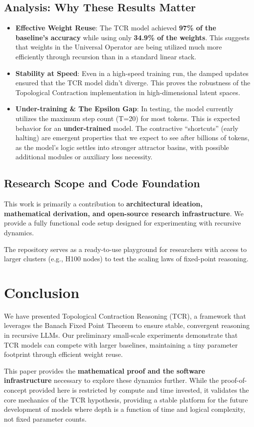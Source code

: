 \documentclass[11pt, a4paper]{article}
\begin{document}
\subsection{Analysis: Why These Results Matter}
\begin{itemize}
    \item \textbf{Effective Weight Reuse}: The TCR model achieved \textbf{97\% of the baseline's accuracy} while using only \textbf{34.9\% of the weights}. This suggests that weights in the Universal Operator are being utilized much more efficiently through recursion than in a standard linear stack.
    \item \textbf{Stability at Speed}: Even in a high-speed training run, the damped updates ensured that the TCR model didn't diverge. This proves the robustness of the Topological Contraction implementation in high-dimensional latent spaces.
    \item \textbf{Under-training \& The Epsilon Gap}: In testing, the model currently utilizes the maximum step count (T=20) for most tokens. This is expected behavior for an \textbf{under-trained} model. The contractive ``shortcuts'' (early halting) are emergent properties that we expect to see after billions of tokens, as the model's logic settles into stronger attractor basins, with possible additional modules or auxiliary loss necessity.
\end{itemize}

\subsection{Research Scope and Code Foundation}
This work is primarily a contribution to \textbf{architectural ideation, mathematical derivation, and open-source research infrastructure}. We provide a fully functional code setup designed for experimenting with recursive dynamics.

The repository serves as a ready-to-use playground for researchers with access to larger clusters (e.g., H100 nodes) to test the scaling laws of fixed-point reasoning.

\section{Conclusion}
We have presented Topological Contraction Reasoning (TCR), a framework that leverages the Banach Fixed Point Theorem to ensure stable, convergent reasoning in recursive LLMs. Our preliminary small-scale experiments demonstrate that TCR models can compete with larger baselines, maintaining a tiny parameter footprint through efficient weight reuse.

This paper provides the \textbf{mathematical proof and the software infrastructure} necessary to explore these dynamics further. While the proof-of-concept provided here is restricted by compute and time invested, it validates the core mechanics of the TCR hypothesis, providing a stable platform for the future development of models where depth is a function of time and logical complexity, not fixed parameter counts.


\end{document}
